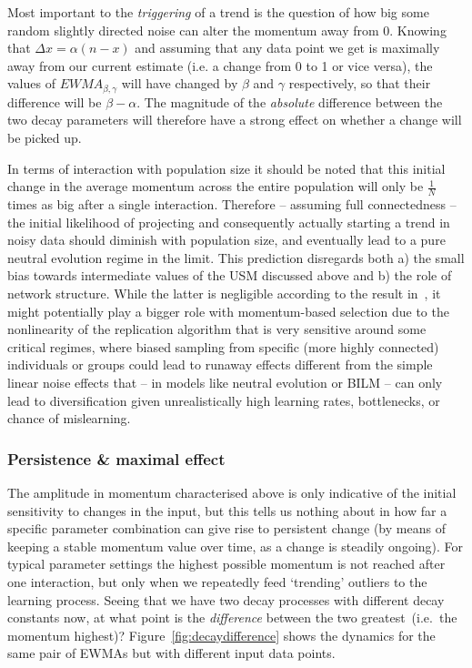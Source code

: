 Most important to the \emph{triggering} of a trend is the question of how big some random slightly directed noise can alter the momentum away from $0$. Knowing that $\Delta x=\alpha(n-x)$ and assuming that any data point we get is maximally away from our current estimate (i.e. a change from 0 to 1 or vice versa), the values of $EWMA_{\beta,\gamma}$ will have changed by $\beta$ and $\gamma$ respectively, so that their difference will be $\beta-\alpha$. The magnitude of the \emph{absolute} difference between the two decay parameters will therefore have a strong effect on whether a change will be picked up.

In terms of interaction with population size it should be noted that this initial change in the average momentum across the entire population will only be $\frac{1}{N}$ times as big after a single interaction. Therefore -- assuming full connectedness -- the initial likelihood of projecting and consequently actually starting a trend in noisy data should diminish with population size, and eventually lead to a pure neutral evolution regime in the limit. This prediction disregards both a) the small bias towards intermediate values of the USM discussed above and b) the role of network structure. While the latter is negligible according to the result in~\cite{Baxter2008}, it might potentially play a bigger role with momentum-based selection due to the nonlinearity of the replication algorithm that is very sensitive around some critical regimes, where biased sampling from specific (more highly connected) individuals or groups could lead to runaway effects different from the simple linear noise effects that -- in models like neutral evolution or BILM -- can only lead to diversification given unrealistically high learning rates, bottlenecks, or chance of mislearning.

\subsubsection{Persistence \& maximal effect}

The amplitude in momentum characterised above is only indicative of the initial sensitivity to changes in the input, but this tells us nothing about in how far a specific parameter combination can give rise to persistent change (by means of keeping a stable momentum value over time, as a change is steadily ongoing). For typical parameter settings the highest possible momentum is not reached after one interaction, but only when we repeatedly feed `trending' outliers to the learning process. Seeing that we have two decay processes with different decay constants now, at what point is the \emph{difference} between the two greatest~(i.e.~the momentum highest)? Figure~\ref{fig:decaydifference} shows the dynamics for the same pair of EWMAs but with different input data points.

